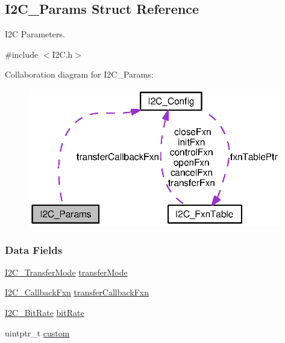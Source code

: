 \subsection{I2\+C\+\_\+\+Params Struct Reference}
\label{struct_i2_c___params}


I2\+C Parameters.  




{\ttfamily \#include $<$I2\+C.\+h$>$}



Collaboration diagram for I2\+C\+\_\+\+Params\+:
\nopagebreak
\begin{figure}[H]
\begin{center}
\leavevmode
\includegraphics[width=313pt]{struct_i2_c___params__coll__graph}
\end{center}
\end{figure}
\subsubsection*{Data Fields}
\begin{DoxyCompactItemize}
\item 
\hyperlink{_i2_c_8h_a39f3b9340fc4ee241b0d2da9b2841c26}{I2\+C\+\_\+\+Transfer\+Mode} \hyperlink{struct_i2_c___params_a79c5c51380ffbdb21df1dff6cb57de0e}{transfer\+Mode}
\item 
\hyperlink{_i2_c_8h_aa7389002843eba77425c73b441358fd1}{I2\+C\+\_\+\+Callback\+Fxn} \hyperlink{struct_i2_c___params_a57edf1b900368904779d0c57a73cf047}{transfer\+Callback\+Fxn}
\item 
\hyperlink{_i2_c_8h_ac954e3197f04c50293db466c4abb6fbe}{I2\+C\+\_\+\+Bit\+Rate} \hyperlink{struct_i2_c___params_ad31857f6dbedb77c60c92cc8cd8cde0c}{bit\+Rate}
\item 
uintptr\+\_\+t \hyperlink{struct_i2_c___params_ac878e36550d6a22742b1a7bb71feb868}{custom}
\end{DoxyCompactItemize}


